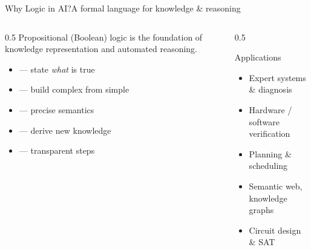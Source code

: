 \documentclass[aspectratio=169,11pt]{beamer}
\begin{document}
\begin{frame}{Why Logic in AI?}{A formal language for knowledge \& reasoning}
  \begin{columns}[T]
    \begin{column}{0.5\textwidth}
      Propositional (Boolean) logic is the foundation of knowledge representation
      and automated reasoning.
      \begin{itemize}\small
        \item {} — state \emph{what} is true
        \item {} — build complex from simple
        \item {} — precise semantics
        \item {} — derive new knowledge
        \item {} — transparent steps
      \end{itemize}
    \end{column}
    \begin{column}{0.5\textwidth}
      \begin{exampleblock}{Applications}
        \small
        \begin{itemize}
          \item Expert systems \& diagnosis
          \item Hardware / software verification
          \item Planning \& scheduling
          \item Semantic web, knowledge graphs
          \item Circuit design \& SAT
        \end{itemize}
      \end{exampleblock}
    \end{column}
  \end{columns}
\end{frame}
\end{document}
